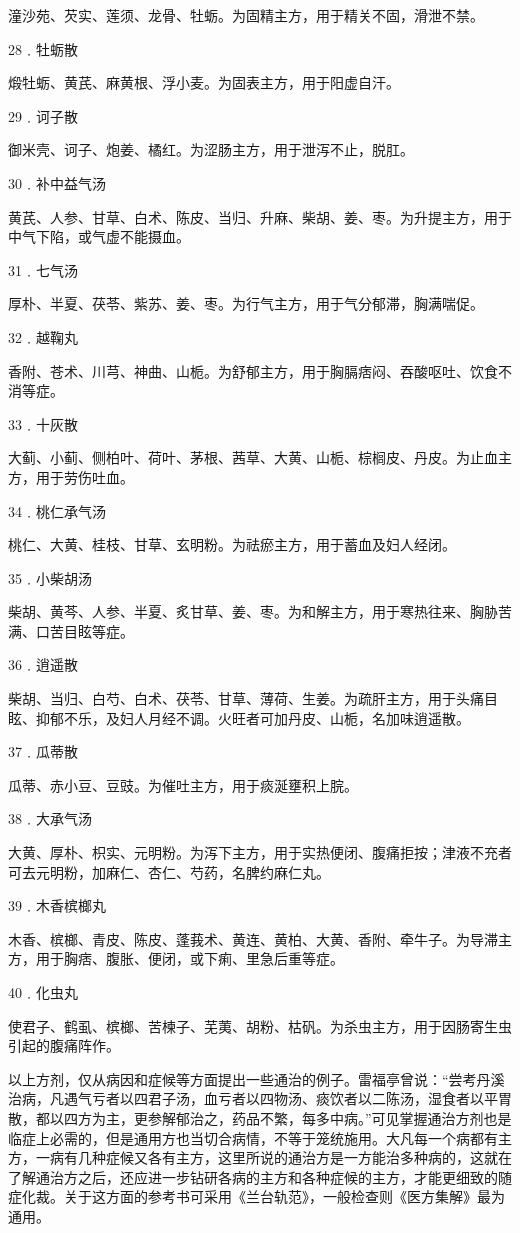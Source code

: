 \documentclass[a4paper,12pt,UTF8,twoside]{ctexbook}
\begin{document}
潼沙苑、芡实、莲须、龙骨、牡蛎。为固精主方，用于精关不固，滑泄不禁。

28﹒牡蛎散

煅牡蛎、黄芪、麻黄根、浮小麦。为固表主方，用于阳虚自汗。

29﹒诃子散

御米壳、诃子、炮姜、橘红。为涩肠主方，用于泄泻不止，脱肛。

30﹒补中益气汤

黄芪、人参、甘草、白术、陈皮、当归、升麻、柴胡、姜、枣。为升提主方，用于中气下陷，或气虚不能摄血。

31﹒七气汤

厚朴、半夏、茯苓、紫苏、姜、枣。为行气主方，用于气分郁滞，胸满喘促。

32﹒越鞠丸

香附、苍术、川芎、神曲、山栀。为舒郁主方，用于胸膈痞闷、吞酸呕吐、饮食不消等症。

33﹒十灰散

大蓟、小蓟、侧柏叶、荷叶、茅根、茜草、大黄、山栀、棕榈皮、丹皮。为止血主方，用于劳伤吐血。

34﹒桃仁承气汤

桃仁、大黄、桂枝、甘草、玄明粉。为祛瘀主方，用于蓄血及妇人经闭。

35﹒小柴胡汤

柴胡、黄芩、人参、半夏、炙甘草、姜、枣。为和解主方，用于寒热往来、胸胁苦满、口苦目眩等症。

36﹒逍遥散

柴胡、当归、白芍、白术、茯苓、甘草、薄荷、生姜。为疏肝主方，用于头痛目眩、抑郁不乐，及妇人月经不调。火旺者可加丹皮、山栀，名加味逍遥散。

37﹒瓜蒂散

瓜蒂、赤小豆、豆豉。为催吐主方，用于痰涎壅积上脘。

38﹒大承气汤

大黄、厚朴、枳实、元明粉。为泻下主方，用于实热便闭、腹痛拒按；津液不充者可去元明粉，加麻仁、杏仁、芍药，名脾约麻仁丸。

39﹒木香槟榔丸

木香、槟榔、青皮、陈皮、蓬莪术、黄连、黄柏、大黄、香附、牵牛子。为导滞主方，用于胸痞、腹胀、便闭，或下痢、里急后重等症。

40﹒化虫丸

使君子、鹤虱、槟榔、苦楝子、芜荑、胡粉、枯矾。为杀虫主方，用于因肠寄生虫引起的腹痛阵作。

以上方剂，仅从病因和症候等方面提出一些通治的例子。雷福亭曾说：“尝考丹溪治病，凡遇气亏者以四君子汤，血亏者以四物汤、痰饮者以二陈汤，湿食者以平胃散，都以四方为主，更参解郁治之，药品不繁，每多中病。”可见掌握通治方剂也是临症上必需的，但是通用方也当切合病情，不等于笼统施用。大凡每一个病都有主方，一病有几种症候又各有主方，这里所说的通治方是一方能治多种病的，这就在了解通治方之后，还应进一步钻研各病的主方和各种症候的主方，才能更细致的随症化裁。关于这方面的参考书可采用《兰台轨范》，一般检查则《医方集解》最为通用。
\end{document}
